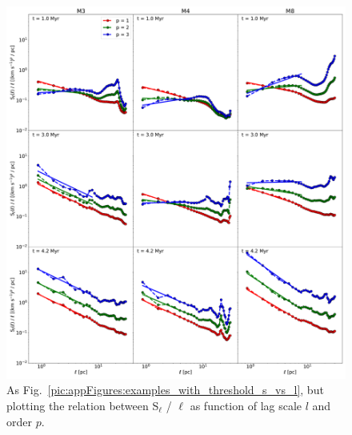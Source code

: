  	
\begin{figure}
    \centering
    \includegraphics[width=\textwidth]{app_examples_wthres_sl_l.pdf}
    \caption{
        As Fig.~\ref{pic:appFigures:examples_with_threshold_s_vs_l}, but plotting the relation between S$_{\ell}$ / $\ell$ as function of lag scale $l$ and order $p$.
    }
    \label{pic:appFigures:examples_with_threshold_sl_vs_l}
\end{figure}
 	
